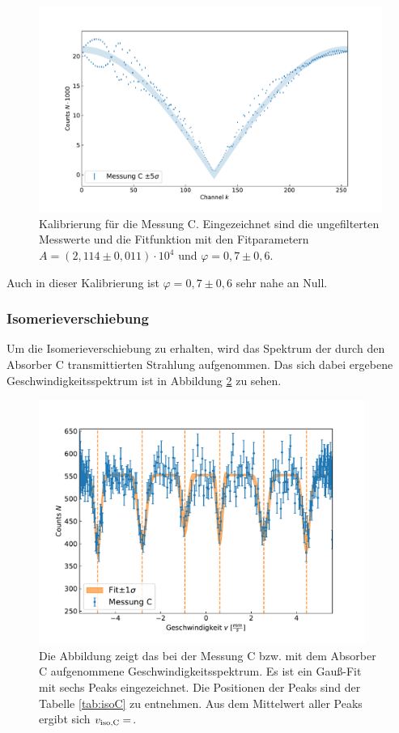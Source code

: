 \documentclass[
a4paper,                %
titlepage=firstiscover, %
captions=tableheading,  %
toc=bibliography,       %
toc=listof,             %
oneside,                %
automark,               %
12pt,                   %
english, ngerman,       %
parskip = half,         %
]{scrartcl}
\begin{document}
\begin{figure}[H]
	\centering
	\includegraphics[width=1.0\textwidth]{dat/velocityC.pdf}
	\caption{Kalibrierung für die Messung C. Eingezeichnet sind die ungefilterten Messwerte und die Fitfunktion mit den Fitparametern $A = (2,114 \pm 0,011) \cdot 10^4$ und $\varphi=0,7 \pm 0,6$.}
	\label{fig:velocityC}
\end{figure}

\noindent Auch in dieser Kalibrierung ist $\varphi = 0,7 \pm 0,6$ sehr nahe an Null.


\subsubsection{Isomerieverschiebung}

Um die Isomerieverschiebung zu erhalten, wird das Spektrum der durch den Absorber C transmittierten Strahlung aufgenommen.
Das sich dabei ergebene Geschwindigkeitsspektrum ist in Abbildung \ref{fig:IsomerieC} zu sehen.

\begin{figure}[H]
	\centering	
	\includegraphics[width=0.95\textwidth]{dat/messungC.pdf}	
	\caption{Die Abbildung zeigt das bei der Messung C bzw. mit dem Absorber C aufgenommene Geschwindigkeitsspektrum. Es ist ein Gauß-Fit mit sechs Peaks eingezeichnet. Die Positionen der Peaks sind der Tabelle \ref{tab:isoC} zu entnehmen. Aus dem Mittelwert aller Peaks ergibt sich $v_\text{iso,C}=\protect$.}
	\label{fig:IsomerieC}
\end{figure}
\end{document}
